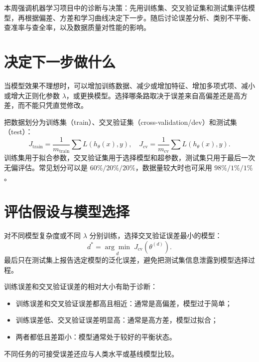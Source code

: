 


\begin{summarybox}
本周强调机器学习项目中的诊断与决策：先用训练集、交叉验证集和测试集评估模型，再根据偏差、方差和学习曲线决定下一步。随后讨论误差分析、类别不平衡、查准率与查全率，以及数据质量对性能的影响。
\end{summarybox}

\section{决定下一步做什么}
\begin{keybox}[常见改进方向]
当模型效果不理想时，可以增加训练数据、减少或增加特征、增加多项式项、减小或增大正则化参数 $\lambda$，或更换模型。选择哪条路取决于误差来自高偏差还是高方差，而不能只凭直觉修改。
\end{keybox}
\begin{definitionbox}
把数据划分为训练集（train）、交叉验证集（cross-validation/dev）和测试集（test）：
\[
J_{\mathrm{train}}=\frac1{m_{\mathrm{train}}}\sum L(h_\theta(x),y),\quad
J_{\mathrm{cv}}=\frac1{m_{\mathrm{cv}}}\sum L(h_\theta(x),y).
\]
训练集用于拟合参数，交叉验证集用于选择模型和超参数，测试集只用于最后一次无偏评估。常见划分可以是 $60\%/20\%/20\%$，数据量较大时也可采用 $98\%/1\%/1\%$。
\end{definitionbox}

\section{评估假设与模型选择}
\begin{definitionbox}[交叉验证选择模型]
对不同模型复杂度或不同 $\lambda$ 分别训练，选择交叉验证误差最小的模型：
\[
  d^*=\underset{d}{\arg\min}\;J_{\mathrm{cv}}(\theta^{(d)}).
\]
最后只在测试集上报告选定模型的泛化误差，避免把测试集信息泄露到模型选择过程。
\end{definitionbox}
\begin{keybox}[偏差与方差诊断]
训练误差和交叉验证误差的相对大小有助于诊断：
\begin{itemize}
  \item 训练误差和交叉验证误差都高且相近：通常是高偏差，模型过于简单；
  \item 训练误差低、交叉验证误差明显高：通常是高方差，模型过拟合；
  \item 两者都低且差距小：模型通常处于较好的平衡状态。
\end{itemize}
不同任务的可接受误差还应与人类水平或基线模型比较。
\end{keybox}

